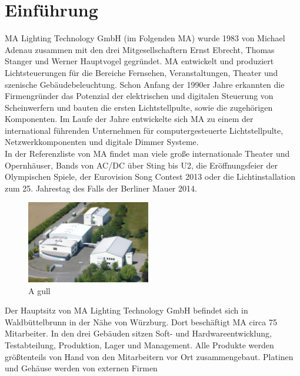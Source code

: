 \documentclass[11pt]{scrartcl}
\begin{document}
\section{Einführung}
MA Lighting Technology GmbH (im Folgenden MA) wurde 1983 von Michael Adenau zusammen mit
den drei Mitgesellschaftern Ernst Ebrecht, Thomas Stanger und Werner Hauptvogel gegründet. MA
entwickelt und produziert Lichtsteuerungen für die Bereiche Fernsehen, Veranstaltungen, Theater
und szenische Gebäudebeleuchtung. Schon Anfang der 1990er Jahre erkannten die Firmengründer
das Potenzial der elektrischen und digitalen Steuerung von Scheinwerfern und bauten die ersten
Lichtstellpulte, sowie die zugehörigen Komponenten. Im Laufe der Jahre entwickelte sich MA zu
einem der international führenden Unternehmen für computergesteuerte Lichtstellpulte,
Netzwerkkomponenten und digitale Dimmer Systeme.\\
In der Referenzliste von MA findet man viele große internationale Theater und Opernhäuser, Bands
von AC/DC über Sting bis U2, die Eröffnungsfeier der Olympischen Spiele, der Eurovision Song
Contest 2013 oder die Lichtinstallation zum 25. Jahrestag des Falls der Berliner Mauer 2014.\\
\begin{figure}
    \vspace{-20pt}
    \begin{center}
      \includegraphics[width=0.48\textwidth]{images/csm_MA_building_WBB.jpg}
    \end{center}
    \vspace{-20pt}
    \caption{A gull}
    \vspace{-10pt}
  \end{figure}
Der Hauptsitz von MA Lighting Technology GmbH
befindet sich in Waldbüttelbrunn in der Nähe von
Würzburg. Dort beschäftigt MA circa 75 Mitarbeiter. In
den drei Gebäuden sitzen Soft- und Hardwareentwicklung,
Testabteilung, Produktion, Lager und
Management. Alle Produkte werden größtenteils von
Hand von den Mitarbeitern vor Ort zusammengebaut.
Platinen und Gehäuse werden von externen Firmen
\end{document}
